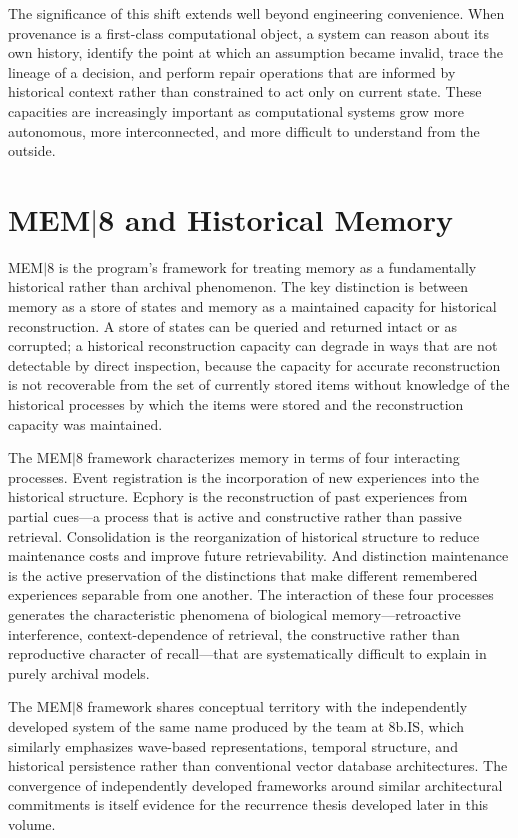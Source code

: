 \documentclass[11pt, oneside]{book}
\theoremstyle{definition}
\theoremstyle{remark}
\begin{document}
The significance of this shift extends well beyond engineering convenience. When provenance is a first-class computational object, a system can reason about its own history, identify the point at which an assumption became invalid, trace the lineage of a decision, and perform repair operations that are informed by historical context rather than constrained to act only on current state. These capacities are increasingly important as computational systems grow more autonomous, more interconnected, and more difficult to understand from the outside.

\section{MEM$|$8 and Historical Memory}

MEM$|$8 is the program's framework for treating memory as a fundamentally historical rather than archival phenomenon. The key distinction is between memory as a store of states and memory as a maintained capacity for historical reconstruction. A store of states can be queried and returned intact or as corrupted; a historical reconstruction capacity can degrade in ways that are not detectable by direct inspection, because the capacity for accurate reconstruction is not recoverable from the set of currently stored items without knowledge of the historical processes by which the items were stored and the reconstruction capacity was maintained.

The MEM$|$8 framework characterizes memory in terms of four interacting processes. Event registration is the incorporation of new experiences into the historical structure. Ecphory is the reconstruction of past experiences from partial cues—a process that is active and constructive rather than passive retrieval. Consolidation is the reorganization of historical structure to reduce maintenance costs and improve future retrievability. And distinction maintenance is the active preservation of the distinctions that make different remembered experiences separable from one another. The interaction of these four processes generates the characteristic phenomena of biological memory—retroactive interference, context-dependence of retrieval, the constructive rather than reproductive character of recall—that are systematically difficult to explain in purely archival models.

The MEM$|$8 framework shares conceptual territory with the independently developed system of the same name produced by the team at 8b.IS, which similarly emphasizes wave-based representations, temporal structure, and historical persistence rather than conventional vector database architectures. The convergence of independently developed frameworks around similar architectural commitments is itself evidence for the recurrence thesis developed later in this volume.
\end{document}
